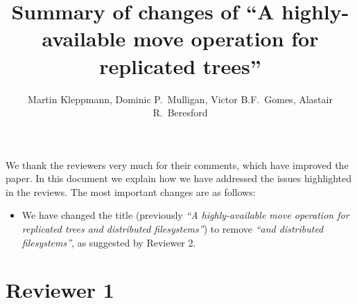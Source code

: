 \documentclass[10pt]{article}
\begin{document}
\title{Summary of changes of ``A highly-available move operation for replicated trees''}
\author{Martin Kleppmann, Dominic P.\ Mulligan, Victor B.F.\ Gomes, Alastair R.\ Beresford}
\date{}
\maketitle

We thank the reviewers very much for their comments, which have improved the paper.
In this document we explain how we have addressed the issues highlighted in the reviews.
The most important changes are as follows:
\begin{itemize}
\item We have changed the title (previously \emph{``A highly-available move operation for replicated trees and distributed filesystems''}) to remove \emph{``and distributed filesystems''}, as suggested by Reviewer 2.
\end{itemize}

\section{Reviewer 1}
\end{document}
